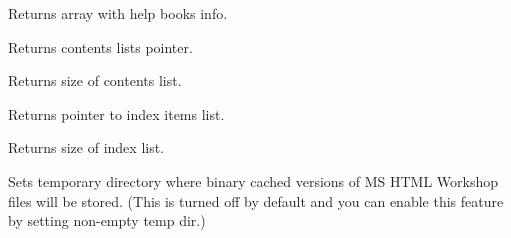 Returns array with help books info.

\label{wxhtmlhelpdatagetcontents}


Returns contents lists pointer.

\label{wxhtmlhelpdatagetcontentscnt}


Returns size of contents list.

\label{wxhtmlhelpdatagetindex}


Returns pointer to index items list.

\label{wxhtmlhelpdatagetindexcnt}


Returns size of index list.

\label{wxhtmlhelpdatasettempdir}


Sets temporary directory where binary cached versions of MS HTML Workshop
files will be stored. (This is turned off by default and you can enable
this feature by setting non-empty temp dir.)

